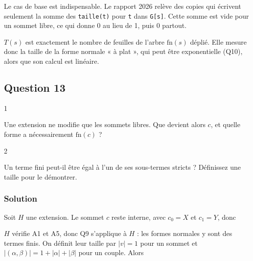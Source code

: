 \documentclass[11pt,a4paper]{article}
\newcommand{\equationajustee}[1]{%
  \sbox{\boiteequation}{$\displaystyle #1$}%
  \ifdim\wd\boiteequation>\linewidth
    \[\resizebox{\linewidth}{!}{\usebox{\boiteequation}}\]%
  \else
    \[#1\]%
  \fi}
\begin{document}
\begin{piege}

Le cas de base est indispensable. Le rapport 2026 relève des copies qui écrivent seulement la somme des \texttt{taille(t)} pour \texttt{t} dans \texttt{G{[}s{]}}. Cette somme est vide pour un sommet libre, ce qui donne 0 au lieu de 1, puis 0 partout.

\end{piege}

\begin{methode}

\(T(s)\) est exactement le nombre de feuilles de l'arbre \(\mathrm{fn}(s)\) déplié. Elle mesure donc la taille de la forme normale « à plat », qui peut être exponentielle (Q10), alors que son calcul est linéaire.

\end{methode}

\hypertarget{question-13}{%
\subsection{Question 13}\label{question-13}}

\begin{indication}{1}

Une extension ne modifie que les sommets libres. Que devient alors \(c\), et quelle forme a nécessairement \(\mathrm{fn}(c)\) ?

\end{indication}

\begin{indication}{2}

Un terme fini peut-il être égal à l'un de ses sous-termes stricts ? Définissez une taille pour le démontrer.

\end{indication}

\hypertarget{solution-12}{%
\subsubsection{Solution}\label{solution-12}}

Soit \(H\) une extension. Le sommet \(c\) reste interne, avec \(c_0=X\) et \(c_1=Y\), donc

\equationajustee{{\mathrm{fn}}_H(c)=\big({\mathrm{fn}}_H(X),\ {\mathrm{fn}}_H(Y)\big).}

\(H\) vérifie A1 et A5, donc Q9 s'applique à \(H\) : les formes normales y sont des termes finis. On définit leur taille par \(|v|=1\) pour un sommet et \(|(\alpha,\beta)|=1+|\alpha|+|\beta|\) pour un couple. Alors
\end{document}
